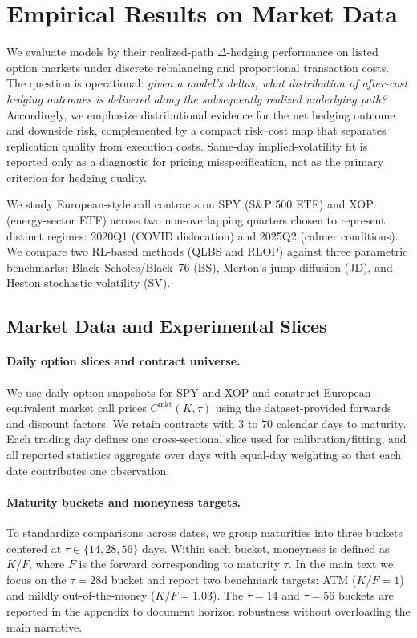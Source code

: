 \section{Empirical Results on Market Data}
\label{sec:empirical_market}

We evaluate models by their realized-path $\Delta$-hedging performance on listed option markets under discrete rebalancing and proportional transaction costs.
The question is operational: \emph{given a model’s deltas, what distribution of after-cost hedging outcomes is delivered along the subsequently realized underlying path?}
Accordingly, we emphasize distributional evidence for the net hedging outcome and downside risk, complemented by a compact risk--cost map that separates replication quality from execution costs.
Same-day implied-volatility fit is reported only as a diagnostic for pricing misspecification, not as the primary criterion for hedging quality.

We study European-style call contracts on SPY (S\&P 500 ETF) and XOP (energy-sector ETF) across two non-overlapping quarters chosen to represent distinct regimes:
2020Q1 (COVID dislocation) and 2025Q2 (calmer conditions).
We compare two RL-based methods (QLBS and RLOP) against three parametric benchmarks:
Black--Scholes/Black--76 \cite{black1973pricing} (BS), Merton’s jump-diffusion \cite{merton1976discontinuous} (JD), and Heston stochastic volatility \cite{heston1993closed} (SV).


\subsection{Market Data and Experimental Slices}
\label{subsec:market_slices}

\paragraph{Daily option slices and contract universe.}
We use daily option snapshots for SPY and XOP and construct European-equivalent market call prices $C^{\mathrm{mkt}}(K,\tau)$ using the dataset-provided forwards and discount factors.
We retain contracts with $3$ to $70$ calendar days to maturity.
Each trading day defines one cross-sectional slice used for calibration/fitting, and all reported statistics aggregate over days with equal-day weighting so that
each date contributes one observation.

\paragraph{Maturity buckets and moneyness targets.}
To standardize comparisons across dates, we group maturities into three buckets centered at $\tau\in\{14,28,56\}$ days.
Within each bucket, moneyness is defined as $K/F$, where $F$ is the forward corresponding to maturity $\tau$.
In the main text we focus on the $\tau=28$d bucket and report two benchmark targets:
ATM ($K/F=1$) and mildly out-of-the-money ($K/F=1.03$).
The $\tau=14$ and $\tau=56$ buckets are reported in the appendix to document horizon robustness without overloading the main narrative.

